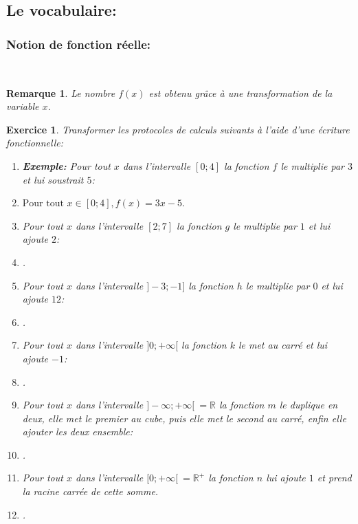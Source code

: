 \documentclass[a4paper,10.5pt]{article}
\newtheorem{defi}{Définition}
\newtheorem{rmq}{Remarque}
\newtheorem{exer}{Exercice}
\newcommand{\R}{\mathbb{R}}
\begin{document}
\subsection{Le vocabulaire:}
\subsubsection{Notion de fonction réelle:}
\medskip

\noindent{}\hfill\\
\begin{rmq}
Le nombre $f(x)$ est obtenu grâce à une transformation de la variable $x$.
\end{rmq}
\begin{exer}
Transformer les protocoles de calculs suivants à l'aide d'une écriture fonctionnelle:
 \begin{enumerate}
\item \textbf{Exemple:} Pour tout $x$ dans l'intervalle $[0;4]$ la fonction $f$ le multiplie par $3$ et lui soustrait $5$: 
\item[$\bullet$]$\text{Pour tout } x\in[0;4] , f(x)= 3x-5. $
\item Pour tout $x$ dans l'intervalle $[2;7]$ la fonction $g$ le multiplie par $1$ et lui ajoute $2$: 
\item[$\bullet$].\dotfill 
\item Pour tout $x$ dans l'intervalle $]-3;-1]$ la fonction $h$ le multiplie par $0$ et lui ajoute $12$: 
\item[$\bullet$].\dotfill 
\item Pour tout $x$ dans l'intervalle $]0;+\infty[$ la fonction $k$ le met au carré et lui ajoute $-1$: 
\item[$\bullet$].\dotfill 
\item Pour tout $x$ dans l'intervalle $ ]-\infty;+\infty[  \ =   \R$ la fonction $m$ le duplique en deux, elle met le premier au cube, puis elle met le second au carré, enfin elle ajouter les deux ensemble:  
\item[$\bullet$].\dotfill 
\item Pour tout $x$ dans l'intervalle $ [0;+\infty[  \ =   \R^+$ la fonction $n$ lui ajoute $1$ et prend la racine carrée de cette somme.   
\item[$\bullet$].\dotfill 
 \end{enumerate}
\end{exer} 
\newpage
\end{document}
